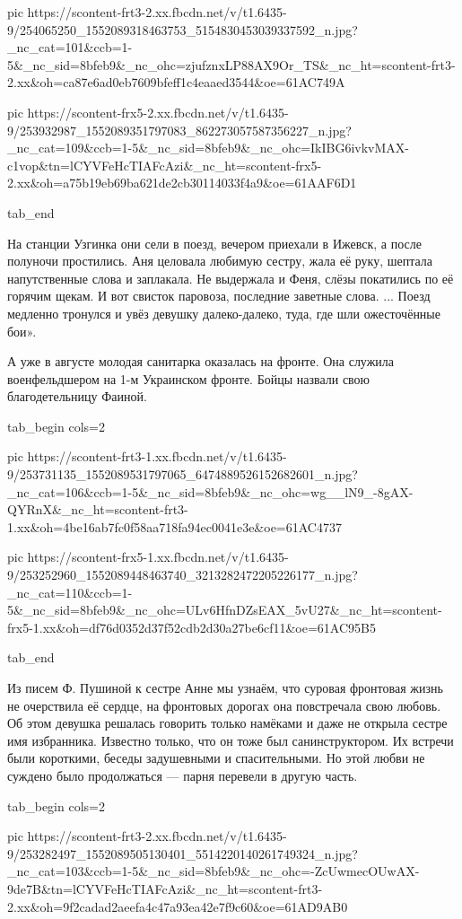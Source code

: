      pic https://scontent-frt3-2.xx.fbcdn.net/v/t1.6435-9/254065250_1552089318463753_5154830453039337592_n.jpg?_nc_cat=101&ccb=1-5&_nc_sid=8bfeb9&_nc_ohc=zjufznxLP88AX9Or_TS&_nc_ht=scontent-frt3-2.xx&oh=ca87e6ad0eb7609bfeff1c4eaaed3544&oe=61AC749A

     pic https://scontent-frx5-2.xx.fbcdn.net/v/t1.6435-9/253932987_1552089351797083_862273057587356227_n.jpg?_nc_cat=109&ccb=1-5&_nc_sid=8bfeb9&_nc_ohc=IkIBG6ivkvMAX-c1vop&tn=lCYVFeHcTIAFcAzi&_nc_ht=scontent-frx5-2.xx&oh=a75b19eb69ba621de2cb30114033f4a9&oe=61AAF6D1

  tab_end
\fi

На станции Узгинка они сели в поезд, вечером приехали в Ижевск, а после
полуночи простились. Аня целовала любимую сестру, жала её руку, шептала
напутственные слова и заплакала. Не выдержала и Феня, слёзы покатились по её
горячим щекам. И вот свисток паровоза, последние заветные слова. ... Поезд
медленно тронулся и увёз девушку далеко-далеко, туда, где шли ожесточённые
бои».

А уже в августе молодая санитарка оказалась на фронте. Она служила
военфельдшером на 1-м Украинском фронте. Бойцы назвали свою благодетельницу
Фаиной.

\ifcmt
  tab_begin cols=2

     pic https://scontent-frt3-1.xx.fbcdn.net/v/t1.6435-9/253731135_1552089531797065_6474889526152682601_n.jpg?_nc_cat=106&ccb=1-5&_nc_sid=8bfeb9&_nc_ohc=wg__lN9_-8gAX-QYRnX&_nc_ht=scontent-frt3-1.xx&oh=4be16ab7fc0f58aa718fa94ec0041e3e&oe=61AC4737

     pic https://scontent-frx5-1.xx.fbcdn.net/v/t1.6435-9/253252960_1552089448463740_3213282472205226177_n.jpg?_nc_cat=110&ccb=1-5&_nc_sid=8bfeb9&_nc_ohc=ULv6HfnDZsEAX_5vU27&_nc_ht=scontent-frx5-1.xx&oh=df76d0352d37f52cdb2d30a27be6cf11&oe=61AC95B5

  tab_end
\fi

Из писем Ф. Пушиной к сестре Анне мы узнаём, что суровая фронтовая жизнь не
очерствила её сердце, на фронтовых дорогах она повстречала свою любовь. Об этом
девушка решалась говорить только намёками и даже не открыла сестре имя
избранника. Известно только, что он тоже был санинструктором. Их встречи были
короткими, беседы задушевными и спасительными. Но этой любви не суждено было
продолжаться — парня перевели в другую часть.

\ifcmt
  tab_begin cols=2

     pic https://scontent-frt3-2.xx.fbcdn.net/v/t1.6435-9/253282497_1552089505130401_5514220140261749324_n.jpg?_nc_cat=103&ccb=1-5&_nc_sid=8bfeb9&_nc_ohc=-ZcUwmecOUwAX-9de7B&tn=lCYVFeHcTIAFcAzi&_nc_ht=scontent-frt3-2.xx&oh=9f2cadad2aeefa4c47a93ea42e7f9c60&oe=61AD9AB0


